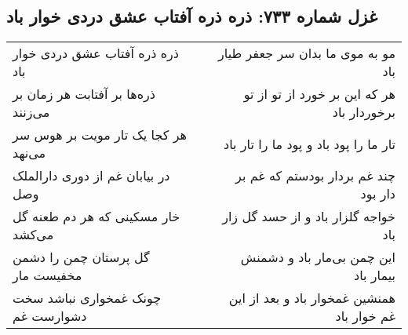 \begin{center}
\section*{غزل شماره ۷۳۳: ذره ذره آفتاب عشق دردی خوار باد}
\label{sec:0733}
\begin{longtable}{l p{0.5cm} r}
ذره ذره آفتاب عشق دردی خوار باد
&&
مو به موی ما بدان سر جعفر طیار باد
\\
ذره‌ها بر آفتابت هر زمان بر می‌زنند
&&
هر که این بر خورد از تو از تو برخوردار باد
\\
هر کجا یک تار مویت بر هوس سر می‌نهد
&&
تار ما را پود باد و پود ما را تار باد
\\
در بیابان غم از دوری دارالملک وصل
&&
چند غم بردار بودستم که غم بر دار بود
\\
خار مسکینی که هر دم طعنه گل می‌کشد
&&
خواجه گلزار باد و از حسد گل زار باد
\\
گل پرستان چمن را دشمن مخفیست مار
&&
این چمن بی‌مار باد و دشمنش بیمار باد
\\
چونک غمخواری نباشد سخت دشوارست غم
&&
همنشین غمخوار باد و بعد از این غم خوار باد
\\
\end{longtable}
\end{center}
